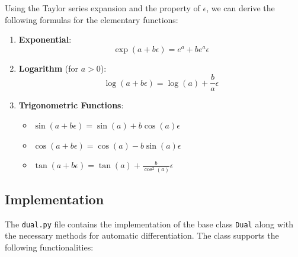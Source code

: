 \documentclass{article}
\begin{document}
Using the Taylor series expansion and the property of $\epsilon$, we can derive the following formulas for the elementary functions:

\begin{enumerate}
    \item \textbf{Exponential}: 
    \[
    \exp(a + b\epsilon) = e^a + be^a\epsilon
    \]

    \item \textbf{Logarithm} (for $a > 0$): 
    \[
    \log(a + b\epsilon) = \log(a) + \frac{b}{a}\epsilon
    \]

    \item \textbf{Trigonometric Functions}: 
    \begin{itemize}
        \item $\sin(a + b\epsilon) = \sin(a) + b\cos(a)\epsilon$
        \item $\cos(a + b\epsilon) = \cos(a) - b\sin(a)\epsilon$
        \item $\tan(a + b\epsilon) = \tan(a) + \frac{b}{\cos^2(a)}\epsilon$
    \end{itemize}
\end{enumerate}

\subsection{Implementation}

The \texttt{dual.py} file contains the implementation of the base class \texttt{Dual} along with the necessary methods for automatic differentiation. The class supports the following functionalities:
\end{document}
